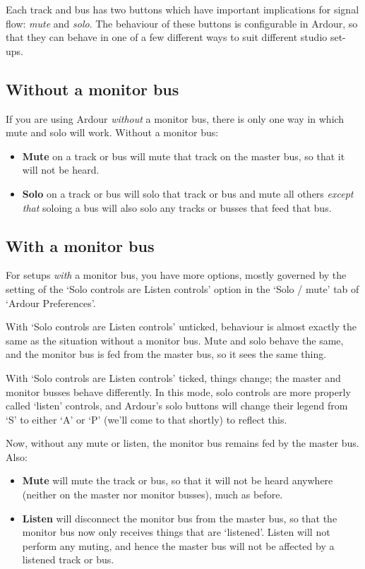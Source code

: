 \documentclass[10pt,a4paper]{book}
\begin{document}
{Each track and bus has two buttons which have important implications
for signal flow: \emph{mute} and \emph{solo}.  The behaviour of these
buttons is configurable in Ardour, so that they can behave in one of a
few different ways to suit different studio set-ups.


\subsection{Without a monitor bus}

If you are using Ardour \emph{without} a monitor bus, there is only
one way in which mute and solo will work.  Without a monitor bus:

\begin{itemize}
\item \textbf{Mute} on a track or bus will mute that track on the
  master bus, so that it will not be heard.
\item \textbf{Solo} on a track or bus will solo that track or bus and
  mute all others \emph{except that} soloing a bus will also solo any
  tracks or busses that feed that bus.
\end{itemize}


\subsection{With a monitor bus}

For setups \emph{with} a monitor bus, you have more options, mostly
governed by the setting of the `Solo controls are Listen controls'
option in the `Solo / mute' tab of `Ardour Preferences'.

With `Solo controls are Listen controls' unticked, behaviour is almost
exactly the same as the situation without a monitor bus.  Mute and
solo behave the same, and the monitor bus is fed from the master bus,
so it sees the same thing.

With `Solo controls are Listen controls' ticked, things change; the
master and monitor busses behave differently.  In this mode, solo
controls are more properly called `listen' controls, and Ardour's solo
buttons will change their legend from `S' to either `A' or `P' (we'll
come to that shortly) to reflect this.

Now, without any mute or listen, the monitor bus remains fed by the
master bus.  Also:

\begin{itemize}
\item \textbf{Mute} will mute the track or bus, so that it will not be
  heard anywhere (neither on the master nor monitor busses), much as before.
\item \textbf{Listen} will disconnect the monitor bus from the master
  bus, so that the monitor bus now only receives things that are
  `listened'.  Listen will not perform any muting, and hence the
  master bus will not be affected by a listened track or bus.
\end{itemize}

}
\end{document}

